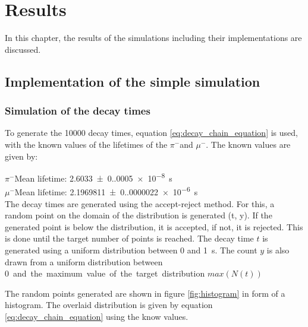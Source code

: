 \documentclass[11pt, a4paper, oneside]{book}
\newcommand{\pion}{$\pi^{-}$}
\newcommand{\muon}{$\mu^{-}$}
\begin{document}
\chapter{Results}

In this chapter, the results of the simulations including their implementations are discussed.

\section{Implementation of the simple simulation}

\subsection{Simulation of the decay times}
To generate the \num{10000} decay times, equation \ref{eq:decay_chain_equation} is used, with the known values of the lifetimes of the \pion and \muon. The known values are given by: \cite{ParticleDataGroup:2024cfk}

\pion Mean lifetime: \qty{2.6033(0.0005)e-8}{\s} \\
\muon Mean lifetime: \qty{2.1969811(0.0000022)e-6}{\s} \\

The decay times are generated using the accept-reject method. For this, a random point on the domain of the distribution is generated (t, y). If the generated point is below the distribution, it is accepted, if not, it is rejected. This is done until the target number of points is reached. 
The decay time $t$ is generated using a uniform distribution between 0 and \qty{1}{\s}. The count $y$ is also drawn from a uniform distribution between \qty{0} and the maximum value of the target distribution $max(N(t))$

The random points generated are shown in figure \ref{fig:histogram} in form of a histogram. The overlaid distribution is given by equation \ref{eq:decay_chain_equation} using the know values.
\end{document}
